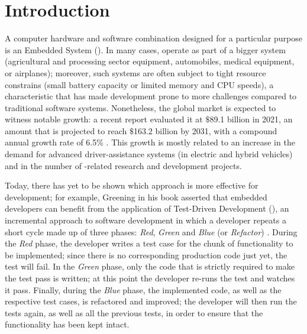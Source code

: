 \chapter{Introduction}
\label{chap:1_introduction}
A computer hardware and software combination designed for a particular purpose is an Embedded System (\es). In many cases, \ess operate as part of a bigger system (\eg  agricultural and processing sector equipment, automobiles, medical equipment, or airplanes); moreover, such systems are often subject to tight resource constrains (\eg small battery capacity or limited memory and CPU speeds), a characteristic that has made \es development prone to more challenges compared to traditional software systems.
Nonetheless, the global \ess market is expected to witness notable growth: a recent report evaluated it at $\$$89.1 billion in 2021, an amount that is projected to reach $\$$163.2 billion by 2031, with a compound annual growth rate of 6.5\% \cite{ESSTR2022}. This growth is mostly related to an increase in the demand for advanced driver-assistance systems (in electric and hybrid vehicles) and in the number of \ess-related research and development projects.  

Today, there has yet to be shown which approach is more effective for \ess development; for example, Greening \cite{TDDEC} in his book asserted that embedded developers can benefit from the application of Test-Driven Development (\tdd), an incremental approach to software development in which a developer repeats a short cycle made up of three phases: \textit{Red}, \textit{Green} and \textit{Blue} (or \textit{Refactor}) \cite{TDDByExample}. 
During the \textit{Red} phase, the developer writes a test case for the chunk of functionality to be implemented; since there is no corresponding production code just yet, the test will fail. 
In the \textit{Green} phase, only the code that is strictly required to make the test pass is written; at this point the developer re-runs the test and watches it pass.
Finally, during the \textit{Blue} phase, the implemented code, as well as the respective test cases, is refactored and improved; the developer will then run the tests again, as well as all the previous tests, in order to ensure that the functionality has been kept intact.

